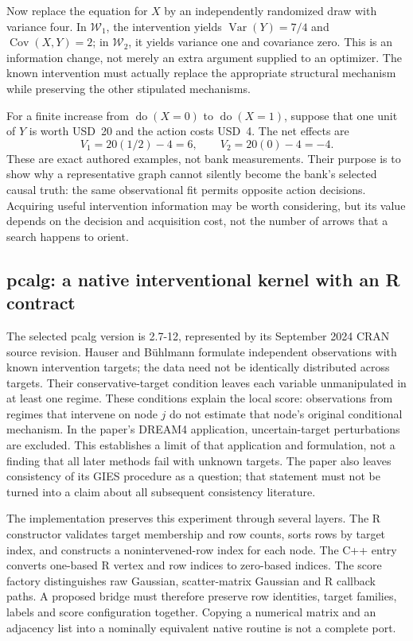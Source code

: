 Now replace the equation for $X$ by an independently randomized draw with
variance four. In $\mathcal W_1$, the intervention yields
$\operatorname{Var}(Y)=7/4$ and $\operatorname{Cov}(X,Y)=2$; in
$\mathcal W_2$, it yields variance one and covariance zero. This is an
information change, not merely an extra argument supplied to an optimizer.
The known intervention must actually replace the appropriate structural
mechanism while preserving the other stipulated mechanisms.

For a finite increase from $\operatorname{do}(X=0)$ to
$\operatorname{do}(X=1)$, suppose that one unit of $Y$ is worth USD~20 and
the action costs USD~4. The net effects are
\[
 V_1=20(1/2)-4=6,\qquad V_2=20(0)-4=-4.
\]
These are exact authored examples, not bank measurements. Their purpose is to
show why a representative graph cannot silently become the bank's selected
causal truth: the same observational fit permits opposite action decisions.
Acquiring useful intervention information may be worth considering, but its
value depends on the decision and acquisition cost, not the number of arrows
that a search happens to orient.\citep{exec16_ct_oracle}

\subsection{pcalg: a native interventional kernel with an R contract}

The selected pcalg version is 2.7-12, represented by its September 2024 CRAN
source revision. Hauser and B\"uhlmann formulate independent observations with
known intervention targets; the data need not be identically distributed
across targets. Their conservative-target condition leaves each variable
unmanipulated in at least one regime. These conditions explain the local
score: observations from regimes that intervene on node $j$ do not estimate
that node's original conditional mechanism. In the paper's DREAM4 application,
uncertain-target perturbations are excluded. This establishes a limit of that
application and formulation, not a finding that all later methods fail with
unknown targets. The paper also leaves consistency of its GIES procedure as a
question; that statement must not be turned into a claim about all subsequent
consistency literature.\citep{exec14_pt_paper_gies}

The implementation preserves this experiment through several layers. The R
constructor validates target membership and row counts, sorts rows by target
index, and constructs a nonintervened-row index for each node. The C++ entry
converts one-based R vertex and row indices to zero-based indices. The score
factory distinguishes raw Gaussian, scatter-matrix Gaussian and R callback
paths. A proposed bridge must therefore preserve row identities, target
families, labels and score configuration together. Copying a numerical matrix
and an adjacency list into a nominally equivalent native routine is not a
complete port.\citep{exec16_ct_pcalg}

